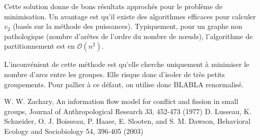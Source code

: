 \documentclass[12pt]{article}
\begin{document}
Cette solution donne de bons résultats approchés pour le problème de
minimisation. Un avantage est qu'il existe des algorithmes efficaces
pour calculer $v_2$ (basés sur la méthode des
puissances). Typiquement, pour un graphe non pathologique (nombre
d'arêtes de l'ordre du nombre de n\oe uds), l'algorithme de
partitionnement est en $\mathcal O(n^2)$.

L'inconvénient de cette méthode est qu'elle cherche uniquement à
minimiser le nombre d'arcs entre les groupes. Elle risque donc
d'isoler de très petits groupements. Pour pallier à ce défaut, on
utilise donc BLABLA renormalisé.

\clearpage
\begin{thebibliography}{2}
 W. W. Zachary, An information flow model for conflict and fission in small groups, Journal of Anthropological Research 33, 452-473 (1977)
 D. Lusseau, K. Schneider, O. J. Boisseau, P. Haase, E. Slooten, and S. M. Dawson, Behavioral Ecology and Sociobiology 54, 396-405 (2003)
\end{thebibliography}
\end{document}
